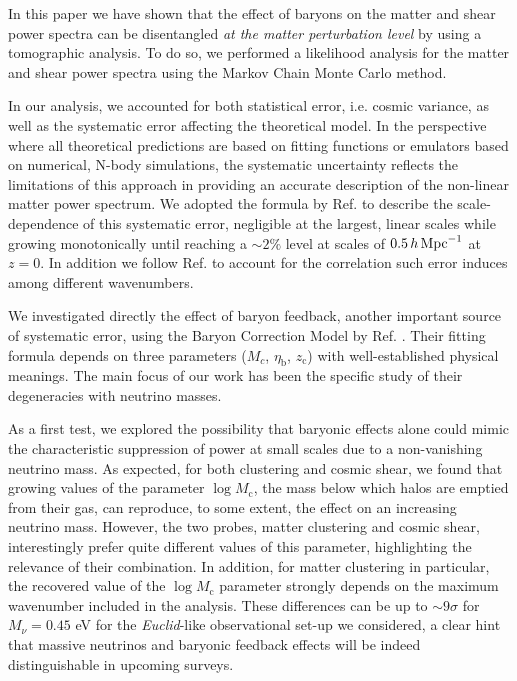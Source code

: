 \documentclass[a4paper,11pt]{article}
\def\logMc{\log M_{\mathrm c}}
\def\kMpc{\, h \, {\rm Mpc}^{-1}}
\begin{document}
In this paper we have shown that the effect of baryons on the matter and shear power spectra can be disentangled \textit{at the matter perturbation level} by using a tomographic analysis. To do so, we performed a likelihood analysis for the matter and shear power spectra using the Markov Chain Monte Carlo method.

In our analysis, we accounted for both statistical error, i.e. cosmic variance, as well as the systematic error affecting the theoretical model. In the perspective where all theoretical predictions are based on fitting functions or emulators based on numerical, N-body simulations, the systematic uncertainty reflects the limitations of this approach in providing an accurate description of the non-linear matter power spectrum. We adopted the formula by Ref. \cite{Bird-HALOFIT+12} to describe the scale-dependence of this systematic error, negligible at the largest, linear scales while growing monotonically until reaching a $\sim2\%$ level at scales of $0.5 \kMpc$  at $z=0$. In addition we follow Ref. \cite{Baldauf+16} to account for the correlation such error induces among different wavenumbers.

We investigated directly the effect of baryon feedback, another important source of systematic error, using the Baryon Correction Model by Ref. \cite{Schneider+15}.
Their fitting formula depends on three parameters ($M_c$, $\eta_\mathrm b$, $z_\mathrm c$) with well-established physical meanings. The main focus of our work has been the specific study of their degeneracies with neutrino masses.

As a first test, we explored the possibility that baryonic effects alone could mimic the characteristic suppression of power at small scales due to a non-vanishing neutrino mass. 
As expected, for both clustering and cosmic shear, we found that  growing values of the parameter $\logMc$, the mass below which halos are emptied from their gas, can reproduce, to some extent, the effect on an increasing neutrino mass.
However, the two probes, matter clustering and cosmic shear, interestingly prefer quite different values of this parameter, highlighting the relevance of their combination. In addition, for matter clustering in particular, the recovered value of the $\logMc$ parameter strongly depends on the maximum wavenumber included in the analysis. These differences can be up to $\sim 9 \sigma$ for $M_\nu = 0.45$ eV for the \textit{Euclid}-like observational set-up we considered, a clear hint that massive neutrinos and baryonic feedback effects will be indeed distinguishable in upcoming surveys.
\end{document}
